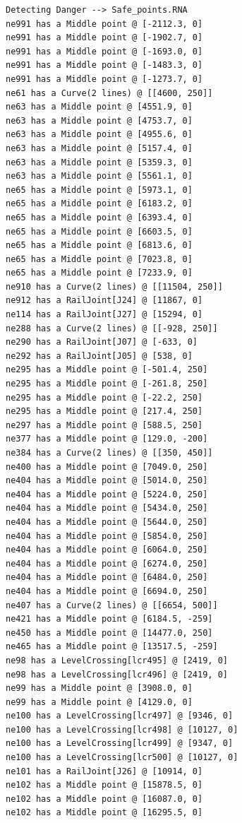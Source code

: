 \begin{lstlisting}[language = {}, tabsize=4, basicstyle=\footnotesize\ttfamily, showspaces=false, showstringspaces=false, caption = Detección de puntos críticos por parte del RNA , label = {lst:EJ4_2}]
Detecting Danger --> Safe_points.RNA
ne991 has a Middle point @ [-2112.3, 0]
ne991 has a Middle point @ [-1902.7, 0]
ne991 has a Middle point @ [-1693.0, 0]
ne991 has a Middle point @ [-1483.3, 0]
ne991 has a Middle point @ [-1273.7, 0]
ne61 has a Curve(2 lines) @ [[4600, 250]]
ne63 has a Middle point @ [4551.9, 0]
ne63 has a Middle point @ [4753.7, 0]
ne63 has a Middle point @ [4955.6, 0]
ne63 has a Middle point @ [5157.4, 0]
ne63 has a Middle point @ [5359.3, 0]
ne63 has a Middle point @ [5561.1, 0]
ne65 has a Middle point @ [5973.1, 0]
ne65 has a Middle point @ [6183.2, 0]
ne65 has a Middle point @ [6393.4, 0]
ne65 has a Middle point @ [6603.5, 0]
ne65 has a Middle point @ [6813.6, 0]
ne65 has a Middle point @ [7023.8, 0]
ne65 has a Middle point @ [7233.9, 0]
ne910 has a Curve(2 lines) @ [[11504, 250]]
ne912 has a RailJoint[J24] @ [11867, 0]
ne114 has a RailJoint[J27] @ [15294, 0]
ne288 has a Curve(2 lines) @ [[-928, 250]]
ne290 has a RailJoint[J07] @ [-633, 0]
ne292 has a RailJoint[J05] @ [538, 0]
ne295 has a Middle point @ [-501.4, 250]
ne295 has a Middle point @ [-261.8, 250]
ne295 has a Middle point @ [-22.2, 250]
ne295 has a Middle point @ [217.4, 250]
ne297 has a Middle point @ [588.5, 250]
ne377 has a Middle point @ [129.0, -200]
ne384 has a Curve(2 lines) @ [[350, 450]]
ne400 has a Middle point @ [7049.0, 250]
ne404 has a Middle point @ [5014.0, 250]
ne404 has a Middle point @ [5224.0, 250]
ne404 has a Middle point @ [5434.0, 250]
ne404 has a Middle point @ [5644.0, 250]
ne404 has a Middle point @ [5854.0, 250]
ne404 has a Middle point @ [6064.0, 250]
ne404 has a Middle point @ [6274.0, 250]
ne404 has a Middle point @ [6484.0, 250]
ne404 has a Middle point @ [6694.0, 250]
ne407 has a Curve(2 lines) @ [[6654, 500]]
ne421 has a Middle point @ [6184.5, -259]
ne450 has a Middle point @ [14477.0, 250]
ne465 has a Middle point @ [13517.5, -259]
ne98 has a LevelCrossing[lcr495] @ [2419, 0]
ne98 has a LevelCrossing[lcr496] @ [2419, 0]
ne99 has a Middle point @ [3908.0, 0]
ne99 has a Middle point @ [4129.0, 0]
ne100 has a LevelCrossing[lcr497] @ [9346, 0]
ne100 has a LevelCrossing[lcr498] @ [10127, 0]
ne100 has a LevelCrossing[lcr499] @ [9347, 0]
ne100 has a LevelCrossing[lcr500] @ [10127, 0]
ne101 has a RailJoint[J26] @ [10914, 0]
ne102 has a Middle point @ [15878.5, 0]
ne102 has a Middle point @ [16087.0, 0]
ne102 has a Middle point @ [16295.5, 0]

\end{lstlisting}
